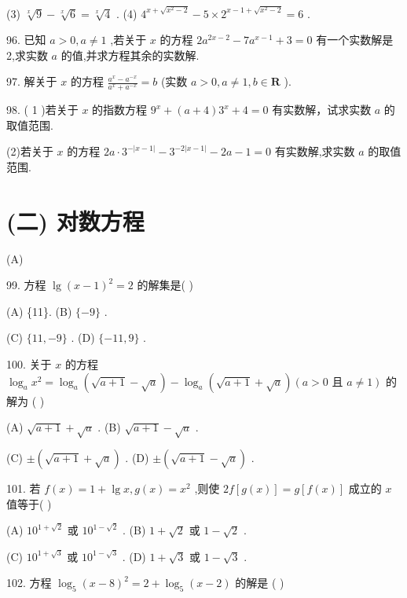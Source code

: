 \documentclass[10pt]{article}
\begin{document}
(3) \(\sqrt[x]{9} - \sqrt[x]{6} = \sqrt[x]{4}\) . (4) \({4}^{x + \sqrt{{x}^{2} - 2}} - 5 \times  {2}^{x - 1 + \sqrt{{x}^{2} - 2}} = 6\) .

96. 已知 \(a > 0,a \neq  1\) ,若关于 \(x\) 的方程 \(2{a}^{{2x} - 2} - 7{a}^{x - 1} + 3 = 0\) 有一个实数解是 2,求实数 \(a\) 的值,并求方程其余的实数解.

97. 解关于 \(x\) 的方程 \(\frac{{a}^{x} - {a}^{-x}}{{a}^{x} + {a}^{-x}} = b\) (实数 \(a > 0,a \neq  1,b \in  \mathbf{R}\) ).

98. ( 1 )若关于 \(x\) 的指数方程 \({9}^{x} + \left( {a + 4}\right) {3}^{x} + 4 = 0\) 有实数解，试求实数 \(a\) 的取值范围.

(2)若关于 \(x\) 的方程 \({2a} \cdot  {3}^{-\left| {x - 1}\right| } - {3}^{-2\left| {x - 1}\right| } - {2a} - 1 = 0\) 有实数解,求实数 \(a\) 的取值范围.

\section*{(二) 对数方程}

(A)

99. 方程 \(\lg {\left( x - 1\right) }^{2} = 2\) 的解集是( )

(A) \{11\}. (B) \(\{  - 9\}\) .

(C) \(\{ {11}, - 9\}\) . (D) \(\{  - {11},9\}\) .

100. 关于 \(x\) 的方程 \({\log }_{a}{x}^{2} = {\log }_{a}\left( {\sqrt{a + 1} - \sqrt{a}}\right)  - {\log }_{a}\left( {\sqrt{a + 1} + \sqrt{a}}\right) \left( {a > 0\text{ 且 }a \neq  1}\right)\) 的解为 ( )

(A) \(\sqrt{a + 1} + \sqrt{a}\) . (B) \(\sqrt{a + 1} - \sqrt{a}\) .

(C) \(\pm  \left( {\sqrt{a + 1} + \sqrt{a}}\right)\) . (D) \(\pm  \left( {\sqrt{a + 1} - \sqrt{a}}\right)\) .

101. 若 \(f\left( x\right)  = 1 + \lg x,g\left( x\right)  = {x}^{2}\) ,则使 \({2f}\left\lbrack  {g\left( x\right) }\right\rbrack   = g\left\lbrack  {f\left( x\right) }\right\rbrack\) 成立的 \(x\) 值等于( )

(A) \({10}^{1 + \sqrt{2}}\) 或 \({10}^{1 - \sqrt{2}}\) . (B) \(1 + \sqrt{2}\) 或 \(1 - \sqrt{2}\) .

(C) \({10}^{1 + \sqrt{3}}\) 或 \({10}^{1 - \sqrt{3}}\) . (D) \(1 + \sqrt{3}\) 或 \(1 - \sqrt{3}\) .

102. 方程 \({\log }_{5}{\left( x - 8\right) }^{2} = 2 + {\log }_{5}\left( {x - 2}\right)\) 的解是 ( )
\end{document}
